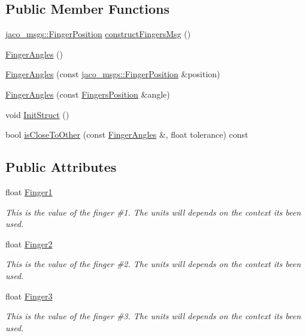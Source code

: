 \subsection*{Public Member Functions}
\begin{DoxyCompactItemize}
\item 
\hyperlink{namespacejaco__msgs_a8d92f0e718e45f82b621ddf049a2f110}{jaco\+\_\+msgs\+::\+Finger\+Position} \hyperlink{classjaco_1_1FingerAngles_afe84a9beae8b4a0617ace657d7608a49}{construct\+Fingers\+Msg} ()
\item 
\hyperlink{classjaco_1_1FingerAngles_a7fab91acaaa9865fd50980053bf21788}{Finger\+Angles} ()
\item 
\hyperlink{classjaco_1_1FingerAngles_a6a5ffbe70cd136c7feef97ee6748577a}{Finger\+Angles} (const \hyperlink{namespacejaco__msgs_a8d92f0e718e45f82b621ddf049a2f110}{jaco\+\_\+msgs\+::\+Finger\+Position} \&position)
\item 
\hyperlink{classjaco_1_1FingerAngles_aba8b42d3e90e791a7b50f2b753be8542}{Finger\+Angles} (const \hyperlink{structFingersPosition}{Fingers\+Position} \&angle)
\item 
void \hyperlink{structFingersPosition_a2d958923675995d54d56e59f8549495d}{Init\+Struct} ()
\item 
bool \hyperlink{classjaco_1_1FingerAngles_a1fb3bd563983bbe24350e89a6b96e715}{is\+Close\+To\+Other} (const \hyperlink{classjaco_1_1FingerAngles}{Finger\+Angles} \&, float tolerance) const 
\end{DoxyCompactItemize}
\subsection*{Public Attributes}
\begin{DoxyCompactItemize}
\item 
float \hyperlink{structFingersPosition_a216f8d64e6a9c7aab84e4269ccb27e66}{Finger1}
\begin{DoxyCompactList}\small\item\em This is the value of the finger \#1. The units will depends on the context it\textquotesingle{}s been used. \end{DoxyCompactList}\item 
float \hyperlink{structFingersPosition_a0ec9675672721d61fb13bbc2db3d3ef9}{Finger2}
\begin{DoxyCompactList}\small\item\em This is the value of the finger \#2. The units will depends on the context it\textquotesingle{}s been used. \end{DoxyCompactList}\item 
float \hyperlink{structFingersPosition_a03c819e4c20367e36e62a864bf829160}{Finger3}
\begin{DoxyCompactList}\small\item\em This is the value of the finger \#3. The units will depends on the context it\textquotesingle{}s been used. \end{DoxyCompactList}\end{DoxyCompactItemize}


